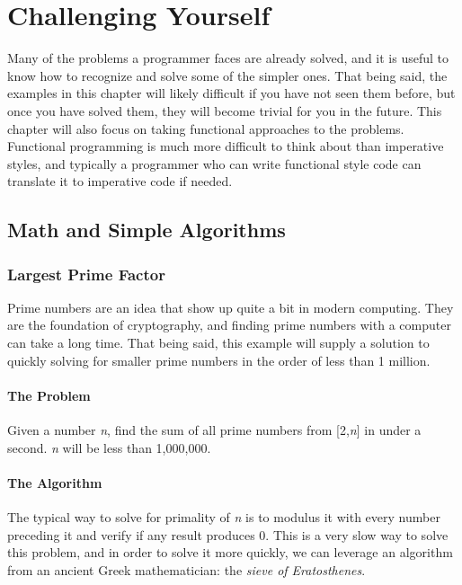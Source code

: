 \documentclass[12pt, oneside, a4paper]{book}
\begin{document}
   \chapter{Challenging Yourself}
   \label{chap:challenge}
      Many of the problems a programmer faces are already solved, and it is useful to know how to recognize and solve some of the simpler ones.
      That being said, the examples in this chapter will likely difficult if you have not seen them before, but once you have solved them, they will become trivial for you in the future.
      This chapter will also focus on taking functional approaches to the problems.
      Functional programming is much more difficult to think about than imperative styles, and typically a programmer who can write functional style code can translate it to imperative code if needed.

      \section{Math and Simple Algorithms}
         \subsection{Largest Prime Factor}
         Prime numbers are an idea that show up quite a bit in modern computing.
         They are the foundation of cryptography, and finding prime numbers with a computer can take a long time.
         That being said, this example will supply a solution to quickly solving for smaller prime numbers in the order of less than 1 million.

         \subsubsection{The Problem}
         Given a number \textit{n}, find the sum of all prime numbers from [2,\textit{n}] in under a second.
         \textit{n} will be less than 1,000,000.

         \subsubsection{The Algorithm}
         The typical way to solve for primality of \textit{n} is to modulus it with every number preceding it and verify if any result produces 0.
         This is a very slow way to solve this problem, and in order to solve it more quickly, we can leverage an algorithm from an ancient Greek mathematician: the \textit{sieve of Eratosthenes}.
\end{document}
